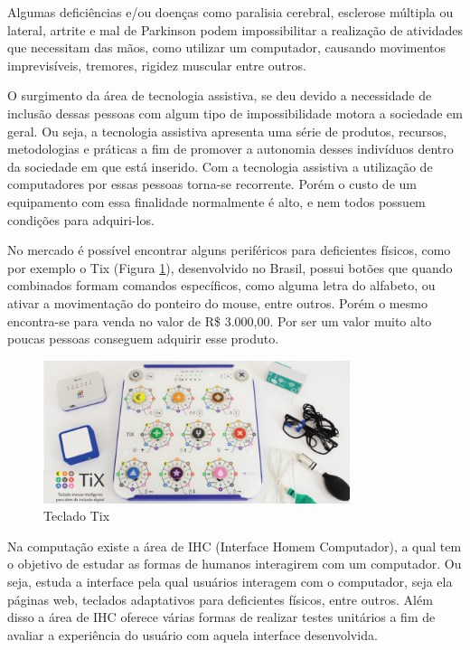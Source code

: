 \documentclass[
	12pt,			%
	openright,		%
	oneside,			%
	a4paper,			%
	chapter=TITLE,		%
	english,			%
	brazil,			%
	]{abntex2}
\begin{document}
Algumas deficiências e/ou doenças como paralisia cerebral, esclerose múltipla ou lateral, artrite e mal de Parkinson podem impossibilitar a realização de atividades que necessitam das mãos, como utilizar um computador, causando movimentos imprevisíveis, tremores, rigidez muscular entre outros.

O surgimento da área de tecnologia assistiva, se deu devido a necessidade de inclusão dessas pessoas com algum tipo de impossibilidade motora a sociedade em geral. Ou seja, a tecnologia assistiva apresenta uma série de produtos, recursos, metodologias e práticas a fim de promover a autonomia desses indivíduos dentro da sociedade em que está inserido. Com a tecnologia assistiva a utilização de computadores por essas pessoas torna-se recorrente. Porém o custo de um equipamento com essa finalidade normalmente é alto, e nem todos possuem condições para adquiri-los.

No mercado é possível encontrar alguns periféricos para deficientes físicos, como por exemplo o Tix (Figura \ref{img:img-14-2}), desenvolvido no Brasil, possui botões que quando combinados formam comandos específicos, como alguma letra do alfabeto, ou ativar a movimentação do ponteiro do mouse, entre outros. Porém o mesmo encontra-se para venda no valor de R\$ 3.000,00. Por ser um valor muito alto poucas pessoas conseguem adquirir esse produto.

\begin{figure}[H]
\centering
		\includegraphics[width=0.8\textwidth]{./img/img-14.png}
		\caption{Teclado Tix}
		\label{img:img-14-2}
\end{figure}

Na computação existe a área de IHC (Interface Homem Computador), a qual tem o objetivo de estudar as formas de humanos interagirem com um computador. Ou seja, estuda a interface pela qual usuários interagem com o computador, seja ela páginas web, teclados adaptativos para deficientes físicos, entre outros. Além disso a área de IHC oferece várias formas de realizar testes unitários a fim de avaliar a experiência do usuário com aquela interface desenvolvida.
\end{document}
